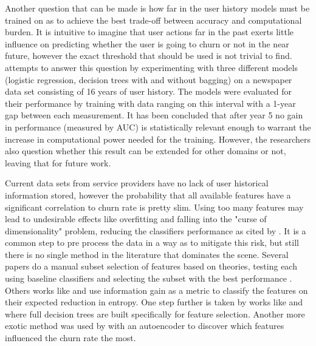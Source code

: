 \documentclass{kththesis}
\begin{document}
Another question that can be made is how far in the user history models must be trained on as to achieve the best trade-off between accuracy and computational burden. It is intuitive to imagine that user actions far in the past exerts little influence on predicting whether the user is going to churn or not in the near future, however the exact threshold that should be used is not trivial to find. \citep{Ballings2012} attempts  to answer this question by experimenting with three different models (logistic regression, decision trees with and without bagging) on a newspaper data set consisting of 16 years of user history. The models were evaluated for their performance by training with data ranging on this interval with a 1-year gap between each measurement. It has been concluded that  after year 5 no gain in performance (measured by AUC) is statistically relevant enough to warrant the increase in computational power needed for the training. However, the researchers also question whether this result can be extended for other domains or not, leaving that for future work.

Current data sets from service providers have no lack of user historical information stored, however the probability that all available features have a significant correlation to churn rate is pretty slim. Using too many features may lead to undesirable effects like overfitting and falling into the "curse of dimensionality" problem, reducing the classifiers performance as cited by \citep{guyon2003introduction}. It is a common step to pre process the data in a way as to mitigate this risk, but still there is no single method in the literature that dominates the scene. Several papers do a manual subset selection of features based on theories, testing each using baseline classifiers and selecting the subset with the best performance \citep{Pudipeddi2014}\citep{Runge2014}. Others works like \citep{Borbora2011} and \citep{Dror2012} use information gain as a metric to classify the features on their expected reduction in entropy. One step further is taken by works like \citep{Lu2014} and \citep{Khan2015} where full decision trees are built specifically for feature selection. Another more exotic method was used by \citep{Wangperawong2016} with an autoencoder to discover which features influenced the churn rate the most. 
\end{document}
